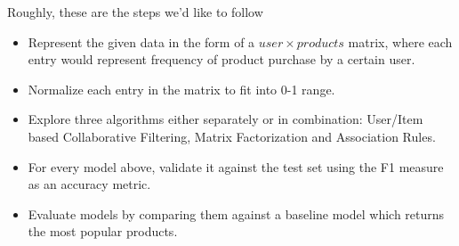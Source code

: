 \documentclass[12pt]{article}
\begin{document}
Roughly, these are the steps we'd like to follow

\begin{itemize}
	\item Represent the given data in the form of a $user \times products$ matrix, where each entry would represent frequency of product purchase by a certain user. 
	\item Normalize each entry in the matrix to fit into 0-1 range.
	\item Explore three algorithms either separately or in combination: User/Item based Collaborative Filtering, Matrix Factorization and Association Rules.
	\item For every model above, validate it against the test set using the F1 measure as an accuracy metric.
	\item Evaluate models by comparing them against a baseline model which returns the most popular products.
\end{itemize}
\end{document}

